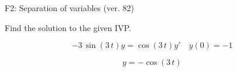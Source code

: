 \begin{exercise}
  \begin{exerciseTitle}F2: Separation of variables (ver. 82)\end{exerciseTitle}
  \begin{exerciseStatement}
    
Find the solution to the given IVP.

    
\[-3 \, \sin\left(3 \, t\right) y= \cos\left(3 \, t\right) y'\hspace{1em} y\left( 0 \right)= -1\]

  \end{exerciseStatement}
  \begin{exerciseAnswer}
    
\[y= -\cos\left(3 \, t\right)\]

  \end{exerciseAnswer}
\end{exercise}